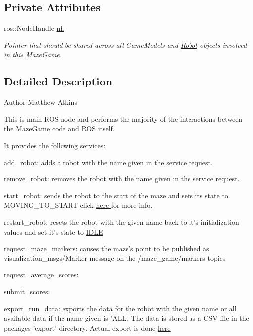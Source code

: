\subsection*{Private Attributes}
\begin{DoxyCompactItemize}
\item 
\hypertarget{classMazeGame_aaabfca5f8cdee9dab2171801f985cae4}{ros\-::\-Node\-Handle \hyperlink{classMazeGame_aaabfca5f8cdee9dab2171801f985cae4}{nh}}\label{classMazeGame_aaabfca5f8cdee9dab2171801f985cae4}

\begin{DoxyCompactList}\small\item\em Pointer that should be shared across all Game\-Models and \hyperlink{classRobot}{Robot} objects involved in this \hyperlink{classMazeGame}{Maze\-Game}. \end{DoxyCompactList}\end{DoxyCompactItemize}


\subsection{Detailed Description}
\begin{DoxyAuthor}{Author}
Matthew Atkins
\end{DoxyAuthor}
This is main R\-O\-S node and performs the majority of the interactions between the \hyperlink{classMazeGame}{Maze\-Game} code and R\-O\-S itself.\par
 It provides the following services\-:\par
 
\begin{DoxyItemize}
\item add\-\_\-robot\-: adds a robot with the name given in the service request. 
\item remove\-\_\-robot\-: removes the robot with the name given in the service request. 
\item start\-\_\-robot\-: sends the robot to the start of the maze and sets its state to M\-O\-V\-I\-N\-G\-\_\-\-T\-O\-\_\-\-S\-T\-A\-R\-T click \hyperlink{namespaceRobotState}{here } for more info. 
\item restart\-\_\-robot\-: resets the robot with the given name back to it's initialization values and set it's state to \hyperlink{namespaceRobotState_a35861cd80d5e6a7efe93588700256f40a91b3fe8ec5cd16e28dc70cb3b28e8aea}{I\-D\-L\-E}  
\item request\-\_\-maze\-\_\-markers\-: causes the maze's point to be published as visualization\-\_\-msgs/\-Marker message on the /maze\-\_\-game/markers topics 
\item request\-\_\-average\-\_\-scores\-:  
\item submit\-\_\-scores\-:  
\item export\-\_\-run\-\_\-data\-: exports the data for the robot with the given name or all available data if the name given is 'A\-L\-L'. The data is stored as a C\-S\-V file in the packages 'export' directory. Actual export is done \hyperlink{classGameModel_a11f9a0ca936f6e4d146d1129738d9c69}{here} 
\end{DoxyItemize}

